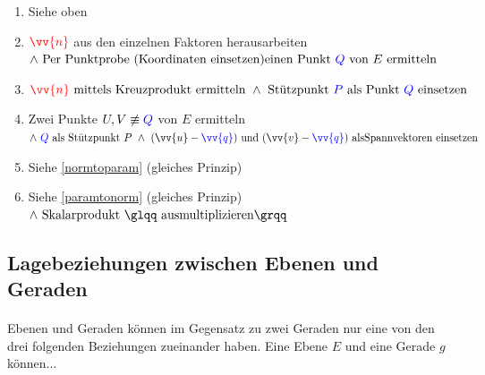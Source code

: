         \begin{enumerate}[1)]
            \item Siehe oben
            \item $\textcolor{red}{\vv{n}}$ aus den einzelnen Faktoren herausarbeiten $\land \text{ Per Punktprobe (Koordinaten
            einsetzen)} \\ \text{einen Punkt $\textcolor{blue}{Q}$ von $E$ ermitteln}$
            \item \label{paramtonorm} $\text{$\textcolor{red}{\vv{n}}$ mittels Kreuzprodukt ermitteln } \land \text{ Stützpunkt $\textcolor{blue}{P}$
            als Punkt $\textcolor{blue}{Q}$ einsetzen}$
            \item \label{normtoparam} Zwei Punkte $U,V \not\equiv \textcolor{blue}{Q}$ von $E$ ermitteln $\land \text{ $\textcolor{blue}{Q}$ als
            Stützpunkt $P$ } \land \text{ $(\vv{u} - \textcolor{blue}{\vv{q}})$ und $(\vv{v} - \textcolor{blue}{\vv{q}})$ als} \\ \text{Spannvektoren
            einsetzen}$
            \item Siehe \ref{normtoparam} (gleiches Prinzip)
            \item Siehe \ref{paramtonorm} (gleiches Prinzip) $\land \text{ Skalarprodukt \glqq ausmultiplizieren\grqq}$
        \end{enumerate}

    \subsection{Lagebeziehungen zwischen Ebenen und Geraden}

        \paragraph{} Ebenen und Geraden können im Gegensatz zu zwei Geraden nur eine von den drei folgenden Beziehungen
        zueinander haben. Eine Ebene $E$ und eine Gerade $g$ können...

